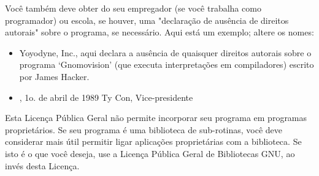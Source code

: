 {Você também deve obter do seu empregador (se você trabalha como
programador) ou escola, se houver, uma "declaração de ausência de
direitos autorais" sobre o programa, se necessário. Aqui está um
exemplo; altere os nomes:
\begin{itemize}
   \item Yoyodyne, Inc., aqui declara a ausência de quaisquer direitos
   autorais sobre o programa `Gnomovision' (que executa interpretações
   em compiladores) escrito por James Hacker.

   \item <assinatura de Ty Coon>, 1o. de abril de 1989
   Ty Con, Vice-presidente
\end{itemize}
Esta Licença Pública Geral não permite incorporar seu programa em
programas proprietários. Se seu programa é uma biblioteca de
sub-rotinas, você deve considerar mais útil permitir ligar aplicações
proprietárias com a biblioteca. Se isto é o que você deseja, use a
Licença Pública Geral de Bibliotecas GNU, ao invés desta Licença.
}

